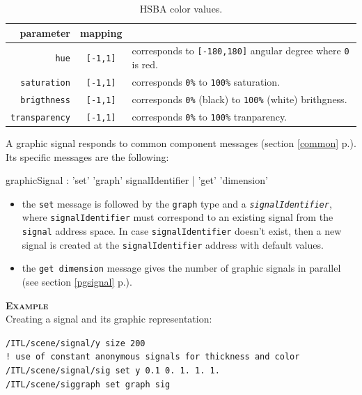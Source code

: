 \documentclass[a4paper,twoside]{report}
\newcommand{\fullref}[1]	{\ref{#1} p.\pageref{#1}}
\newcommand{\OSC}[1]		{\texttt{#1}}
\newcommand{\example}		{\textbf{\hspace{-1.5cm}\textbf{\textsc{Example }}}}
\newcommand{\sample}	[1]			{\vspace{-2mm}\begin{center}\colorbox{mygrey}{
								\begin{minipage}[t]{0.9\columnwidth} 
								{\small \texttt{#1}}
								\end{minipage}}\end{center}}
\begin{document}
\begin{table}[htdp]
\caption{HSBA color values.}
\begin{center}
\begin{tabular}{|r|cl|}
\hline
parameter & mapping & \\
\hline
\OSC{hue}				& \OSC{[-1,1]} & corresponds to \OSC{[-180,180]} angular degree where \OSC{0} is red. \\
\OSC{saturation}		& \OSC{[-1,1]} & corresponds \OSC{0\%} to \OSC{100\%} saturation. \\
\OSC{brigthness}		& \OSC{[-1,1]} & corresponds \OSC{0\%} (black) to \OSC{100\%} (white) brithgness. \\
\OSC{transparency}		& \OSC{[-1,1]} & corresponds \OSC{0\%} to \OSC{100\%} tranparency. \\
\hline
\end{tabular}
\end{center}
\label{hsbamap}
\end{table}



A graphic signal responds to common component messages (section \fullref{common}). Its specific messages are the following:
\begin{rail}
graphicSignal : 'set' 'graph' signalIdentifier 
			| 'get' 'dimension'
\end{rail}

\begin{itemize}
\item the \OSC{set} message is followed by the \OSC{graph} type and a \OSC{\textit{signalIdentifier}}, where \OSC{signalIdentifier} must correspond to an existing signal from the \OSC{signal} address space. In case \OSC{signalIdentifier} doesn't exist, then a new signal is created at the \OSC{signalIdentifier} address with default values. 
\item the \OSC{get dimension} message gives the number of graphic signals in parallel (see section \fullref{pgsignal}). 
 \end{itemize}
 
\example \\
Creating a signal and its graphic representation:
\sample{/ITL/scene/signal/y size 200  \\
! use of constant anonymous signals for thickness and color\\
/ITL/scene/signal/sig set y 0.1 0. 1. 1. 1.  \\
/ITL/scene/siggraph set graph sig 
}
\end{document}
